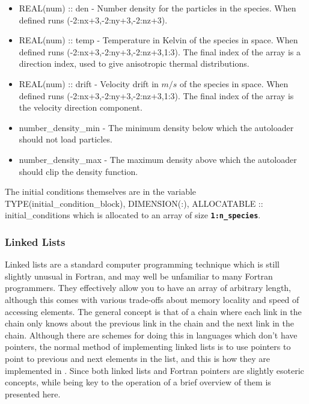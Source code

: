 \documentclass[12pt,a4paper]{article}
\newcommand{\inlinecode}[1]{{\color{warwickred} \bf\texttt{#1}}}
\newcommand{\EPOCH}{{\color{warwickdark}\fontfamily{phv}\selectfont{EPOCH}}}
\newenvironment{boxverbatim}{\lboxverbatim{none}}{\endlboxverbatim}
\begin{document}
\begin{itemize}
\item REAL(num) :: den - Number density for the particles in the species. When
  defined runs (-2:nx+3,-2:ny+3,-2:nz+3).
\item REAL(num) :: temp - Temperature in Kelvin of the species in space. When
  defined runs (-2:nx+3,-2:ny+3,-2:nz+3,1:3). The final index of the array
  is a direction index, used to give anisotropic thermal distributions.
\item REAL(num) :: drift - Velocity drift in $m/s$ of the species in space. When
  defined runs (-2:nx+3,-2:ny+3,-2:nz+3,1:3). The final index of the array
  is the velocity direction component.
\item number\_density\_min - The minimum density below which the autoloader
  should not load particles.
\item number\_density\_max - The maximum density above which the autoloader
  should clip the density function.
\end{itemize}

The initial conditions themselves are in the variable
\begin{boxverbatim}
TYPE(initial_condition_block), DIMENSION(:), ALLOCATABLE :: initial_conditions
\end{boxverbatim}
which is allocated to an array of size \inlinecode{1:n\_species}.

\subsubsection{Linked Lists}
Linked lists are a standard computer programming technique which is still
slightly unusual in Fortran, and may well be unfamiliar to many Fortran
programmers. They effectively allow you to have an array of arbitrary length,
although this comes with various trade-offs about memory locality and speed of
accessing elements. The general concept is that of a chain where each link in
the chain only knows about the previous link in the chain and the next link in
the chain. Although there are schemes for doing this in languages which don't
have pointers, the normal method of implementing linked lists is to use
pointers to point to previous and next elements in the list, and this is how
they are implemented in {\EPOCH}. Since both linked lists and Fortran pointers
are slightly esoteric concepts, while being key to the operation of {\EPOCH} a
brief overview of them is presented here.\\
\end{document}
